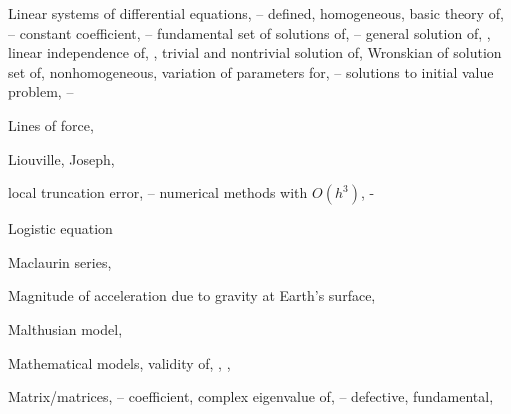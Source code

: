 \begin{theindex}
  \item Linear systems of differential equations, \pageref{eq:10.2.1}--\pageref{exer:10.7.23}
    \subitem defined, \pageref{eq:10.2.1}
    \subitem homogeneous, \pageref{eq:10.2.1}
      \subsubitem basic theory of, \pageref{eq:10.3.1}--\pageref{exer:10.3.18}
      \subsubitem constant coefficient, \pageref{eq:10.4.1}--\pageref{exer:10.6.40}
      \subsubitem fundamental set of solutions of, \pageref{eq:10.3.1}--\pageref{thmtype:10.3.3}
      \subsubitem general solution of, \pageref{eq:10.3.1}, \pageref{thmtype:10.3.3}
      \subsubitem linear independence of, \pageref{eq:10.3.2}, \pageref{thmtype:10.3.3}
      \subsubitem trivial and nontrivial solution of, \pageref{eq:10.3.1}
      \subsubitem Wronskian of solution set of, \pageref{thmtype:10.3.2}
    \subitem nonhomogeneous, \pageref{eq:10.2.2}
      \subsubitem variation of parameters for, \pageref{thmtype:10.7.1}--\pageref{exer:10.7.21}
    \subitem solutions to initial value problem, \pageref{eq:10.2.1}--\pageref{eq:10.2.6}

  \item Lines of force, \pageref{eq:4.5.16}

  \item Liouville, Joseph, \pageref{eq:13.2.10}

  \item local truncation error, \pageref{eq:3.1.8}--\pageref{eq:3.1.18}
    \subitem numerical methods with $O(h^{3})$, \pageref{eq:3.2.7}-\pageref{exer:3.2.1}

  \item Logistic equation \pageref{eq:1.1.4} 

  \item Maclaurin series, \pageref{eq:7.1.2}

  \item Magnitude of acceleration due to gravity at Earth's surface, \pageref{eq:4.3.2}

  \item Malthusian model, \pageref{eq:1.1.2}

  \item Mathematical models, \pageref{eq:1.1.1}
    \subitem validity of, \pageref{eq:4.1.15}, \pageref{eq:4.2.1}, \pageref{exer:4.2.17}

  \item Matrix/matrices, \pageref{eq:10.2.2}--\pageref{exer:10.2.1}
    \subitem coefficient,
      \subsubitem complex eigenvalue of, \pageref{thmtype:10.6.1}--\pageref{exer:10.6.40}
      \subsubitem defective, \pageref{example:10.5.1}
    \subitem fundamental, \pageref{example:10.3.2}


\end{theindex}
